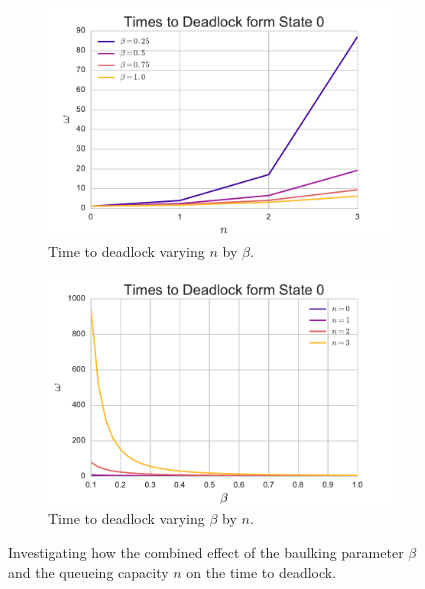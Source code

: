 \documentclass{article}
\begin{document}
\begin{figure}[!hbtp]
\begin{center}
\begin{subfigure}[b]{0.45\textwidth}
    \includegraphics[width=\textwidth]{img/varyn_bybeta.pdf}
    \caption{Time to deadlock varying $n$ by $\beta$.}
    \label{fig:varynbybeta}
\end{subfigure}
\begin{subfigure}[b]{0.45\textwidth}
    \includegraphics[width=\textwidth]{img/varybeta_byn.pdf}
    \caption{Time to deadlock varying $\beta$ by $n$.}
    \label{fig:varybetabyn}
\end{subfigure}
\end{center}
\caption{Investigating how the combined effect of the baulking parameter $\beta$ and the queueing capacity $n$ on the time to deadlock.}
\label{fig:combinedeffect_betan}
\end{figure}
\end{document}
